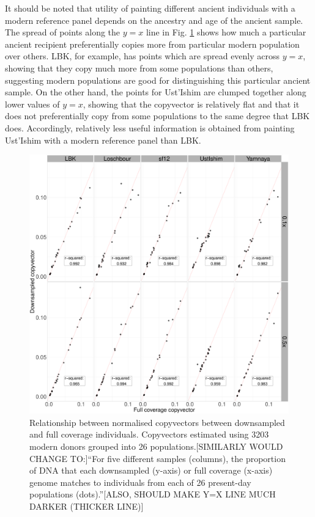 It should be noted that utility of painting different ancient individuals with a modern reference panel depends on the ancestry and age of the ancient sample. The spread of points along the $y=x$ line in Fig. \ref{fig:CP_correlation_allSamples_0.1x_0.5x_30x_moderns} shows how much a particular ancient recipient preferentially copies more from particular modern population over others. LBK, for example, has points which are spread evenly across $y=x$, showing that they copy much more from some populations than others, suggesting modern populations are good for distinguishing this particular ancient sample. On the other hand, the points for Ust'Ishim are clumped together along {\color{red}lower values of} $y=x$, showing that the copyvector is relatively flat and that it does not preferentially copy from some populations to the same degree that LBK does. Accordingly, relatively less useful information is obtained from painting Ust'Ishim with a modern reference panel than LBK.

\begin{figure}[htp]
    \centering
    \includegraphics[width=1.0\textwidth]{../images/chapter1/CP_correlation_allSamples_0.1x_0.5x_30x_moderns.pdf}
    \caption{Relationship between normalised copyvectors between downsampled and full coverage individuals. Copyvectors estimated using 3203 modern donors grouped into 26 populations.{\color{red}[SIMILARLY WOULD CHANGE TO:]``For five different samples (columns), the proportion of DNA that each downsampled (y-axis) or full coverage (x-axis) genome matches to individuals from each of 26 present-day populations (dots).''[ALSO, SHOULD MAKE Y=X LINE MUCH DARKER (THICKER LINE)]}}
    \label{fig:CP_correlation_allSamples_0.1x_0.5x_30x_moderns}
\end{figure}

